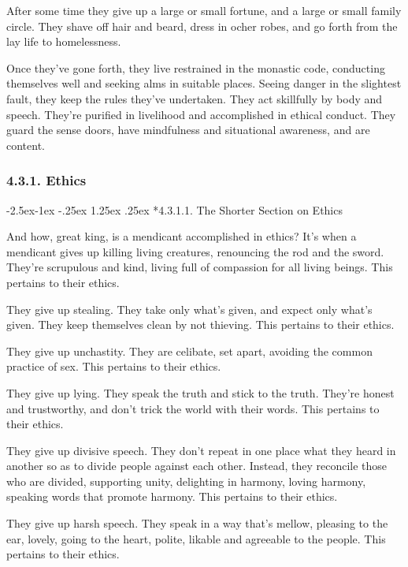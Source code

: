 \documentclass[12pt,openany]{book}%
\makeatletter
\renewcommand\paragraph{\@startsection{paragraph}{4}{\z@}%
            {-2.5ex\@plus -1ex \@minus -.25ex}%
            {1.25ex \@plus .25ex}%
            {\noindent\Semiboldnormalfont\normalsize}}
\makeatother
\begin{document}
After some time they give up a large or small fortune, and a large or small family circle. They shave off hair and beard, dress in ocher robes, and go forth from the lay life to homelessness. 

Once they’ve gone forth, they live restrained in the monastic code, conducting themselves well and seeking alms in suitable places. Seeing danger in the slightest fault, they keep the rules they’ve undertaken. They act skillfully by body and speech. They’re purified in livelihood and accomplished in ethical conduct. They guard the sense doors, have mindfulness and situational awareness, and are content. 

\subsubsection*{4.3.1. Ethics }

\paragraph*{4.3.1.1. The Shorter Section on Ethics }

And how, great king, is a mendicant accomplished in ethics? It’s when a mendicant gives up killing living creatures, renouncing the rod and the sword. They’re scrupulous and kind, living full of compassion for all living beings. This pertains to their ethics. 

They give up stealing. They take only what’s given, and expect only what’s given. They keep themselves clean by not thieving. This pertains to their ethics. 

They give up unchastity. They are celibate, set apart, avoiding the common practice of sex. This pertains to their ethics. 

They give up lying. They speak the truth and stick to the truth. They’re honest and trustworthy, and don’t trick the world with their words. This pertains to their ethics. 

They give up divisive speech. They don’t repeat in one place what they heard in another so as to divide people against each other. Instead, they reconcile those who are divided, supporting unity, delighting in harmony, loving harmony, speaking words that promote harmony. This pertains to their ethics. 

They give up harsh speech. They speak in a way that’s mellow, pleasing to the ear, lovely, going to the heart, polite, likable and agreeable to the people. This pertains to their ethics. 
\end{document}
